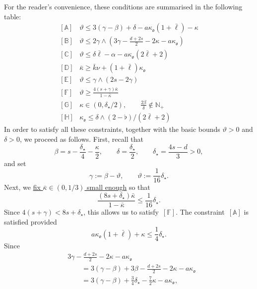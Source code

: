 \documentclass{article}
\numberwithin{equation}{section}
\newcommand{\assign}{:=}
\theoremstyle{plain}
\theoremstyle{definition}
\begin{document}
For the reader's convenience, these conditions are summarised in the following
table:
\[ \begin{array}{lc}
     {}[\mathbb{A}] & \vartheta \leqslant 3 (\gamma - \beta) + \delta - a
     \kappa_{\mathfrak{o}} (1 + \bar{\ell}) - \kappa\\
     {}[\mathbb{B}] & \vartheta \leqslant 2 \gamma \wedge \left( 3 \gamma -
     \frac{d + 2 s}{2} - 2 \kappa - a \kappa_{\mathfrak{o}} \right)\\
     {}[\mathbb{C}] & \vartheta \leqslant \delta \bar{\ell} - \alpha - a
     \kappa_{\mathfrak{o}} (2 \bar{\ell} + 2)\\
     {}[\mathbb{D}] & \bar{\kappa} \geqslant \bar{k} \nu + (1 + \bar{\ell})
     \kappa_{\mathfrak{o}}\\
     {}[\mathbb{E}] & \vartheta \leqslant \gamma \wedge (2 s - 2 \gamma)\\
     {}[\mathbb{F}] & \vartheta \geqslant \frac{4 (s + \gamma) 
     \bar{\kappa}}{1 - \bar{\kappa}}\\
     {}[\mathbb{G}] & \kappa \in (0, \delta_{\star} / 2), \qquad
     \frac{2 \beta}{\delta}\notin\mathbb N_+\\
     {}[\mathbb{H}] & \kappa_{\mathfrak{o}} \leqslant \delta
     \wedge (2-\flat) / (2 \bar{\ell} + 2)
   \end{array} \]
In order to satisfy all these constraints, together with the basic bounds
$\vartheta > 0$ and $\delta > 0$, we proceed as follows. First, recall that
\[
\beta=s-\frac{\delta_{\star}}{4}-\frac{\kappa}{2},
\qquad
\delta = \frac{\delta_\star}2,
\qquad
\delta_{\star} = \frac{4 s - d}{3} > 0,
\]
and set
\begin{equation}
  \gamma \assign \beta - \vartheta,
  \qquad
  \vartheta \assign \frac{1}{16} \delta_{\star}.
  \label{eq:fix-gamma-zeta}
\end{equation}
Next, we {\underline{fix $\bar{\kappa} \in(0,1/3)$ small enough}} so that
\[ \frac{(8s + \delta_\star)  \bar{\kappa}}{1 - \bar{\kappa}} \leqslant \frac{1}{16}
   \delta_{\star}. \]
Since 
$4(s+\gamma)<8s+\delta_\star$, this allows us to satisfy~$[\mathbb{F}]$. The constraint~$[\mathbb{A}]$ is
satisfied provided
\begin{equation}
  a \kappa_{\mathfrak{o}} (1 + \bar{\ell}) + \kappa \leqslant \frac{1}{4}
  \delta_{\star} . \label{eq:const-kappa-two}
\end{equation}
Since 
\begin{align*}
   &3 \gamma - \frac{d + 2 s}{2} - 2 \kappa - a \kappa_{\mathfrak{o}}\\
   &\qquad = 3(\gamma - \beta) + 3 \beta
   - \frac{d + 2 s}{2} - 2 \kappa - a \kappa_{\mathfrak{o}}\\
   &\qquad = 3(\gamma - \beta) + \frac{3}{4} \delta_{\star}
   - \frac{7}{2} \kappa - a \kappa_{\mathfrak{o}},
\end{align*}
\end{document}
